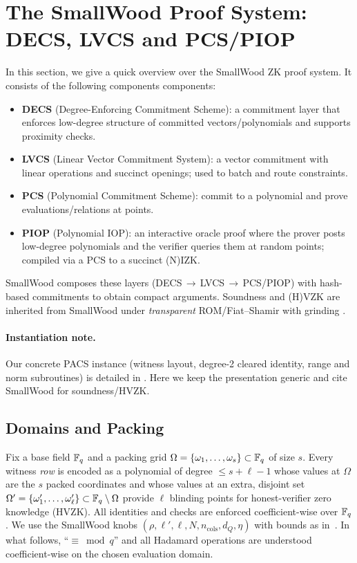 \section{The SmallWood Proof System: DECS, LVCS and PCS/PIOP}
\label{sec:smallwood}

In this section, we give a quick overview over the SmallWood ZK proof system. It consists of the following components components:
\begin{itemize}[leftmargin=1.25em]
  \item \textbf{DECS} (Degree-Enforcing Commitment Scheme): a commitment layer that enforces low-degree structure of committed vectors/polynomials and supports proximity checks.
  \item \textbf{LVCS} (Linear Vector Commitment System): a vector commitment with linear operations and succinct openings; used to batch and route constraints.
  \item \textbf{PCS} (Polynomial Commitment Scheme): commit to a polynomial and prove evaluations/relations at points.
  \item \textbf{PIOP} (Polynomial IOP): an interactive oracle proof where the prover posts low-degree polynomials and the verifier queries them at random points; compiled via a PCS to a succinct (N)IZK.
\end{itemize}
SmallWood composes these layers (DECS\,$\rightarrow$\,LVCS\,$\rightarrow$\,PCS/PIOP) with hash-based commitments to obtain compact arguments.
Soundness and (H)VZK are inherited from SmallWood under \emph{transparent} ROM/Fiat--Shamir with grinding \cite{cryptoeprint:2025/1085}.

\paragraph{Instantiation note.}
Our concrete PACS instance (witness layout, degree-2 cleared identity, range and norm subroutines) is detailed in . Here we keep the presentation generic and cite SmallWood for soundness/HVZK.


\subsection{Domains and Packing}
\label{subsec:domains-packing}
Fix a base field $\mathbb{F}_q$ and a packing grid $\Omega=\{\omega_1,\dots,\omega_s\}\subset\mathbb{F}_q$ of size $s$.
Every witness \emph{row} is encoded as a polynomial of degree $\le s+\ell-1$ whose values at $\Omega$
are the $s$ packed coordinates and whose values at an extra, disjoint set
$\Omega'=\{\omega'_1,\dots,\omega'_\ell\}\subset\mathbb{F}_q\setminus\Omega$ provide $\ell$ blinding points for
honest-verifier zero knowledge (HVZK). All identities and checks are enforced coefficient-wise over $\mathbb{F}_q$.
We use the SmallWood knobs $(\rho,\ell',\ell,N,n_{\text{cols}},d_Q,\eta)$ with bounds as in~\cite{cryptoeprint:2025/1085}.
In what follows, ``$\equiv \bmod q$'' and all Hadamard operations are understood coefficient-wise on the chosen evaluation domain.


